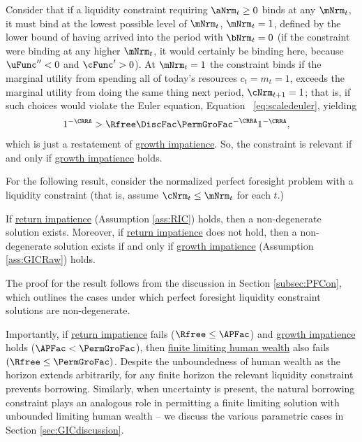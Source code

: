 \documentclass[BufferStockTheory]{subfiles}
\begin{document}
Consider that if a liquidity constraint requiring $\aNrm_{t} \geq 0$ binds at any $\mNrm_{t}$, it must bind at the lowest possible level of $\mNrm_{t}$, $\mNrm_{t}=1$, defined by the lower bound of having arrived into the period with $\bNrm_{t}=0$ (if the constraint were binding at any higher $\mNrm_{t}$, it would certainly be binding here, because $\uFunc^{\prime\prime}<0$ and $\cFunc^{\prime}>0$).
At $\mNrm_{t}=1$ the constraint binds if the marginal utility from spending all of today's resources $c_{t}=m_{t}=1$, exceeds the marginal utility from doing the same thing next period, $\cNrm_{t+1}=1$; that is, if such choices would violate the Euler equation, Equation ~\eqref{eq:scaledeuler}, yielding
\begin{align}
  1^{-\CRRA}  & > \Rfree \DiscFac \PermGroFac^{-\CRRA}1^{-\CRRA},  \label{eq:LiqConstrBinds}
\end{align}
which is just a restatement of \hyperlink{GIC}{growth impatience}.
So, the constraint is relevant if and only if \hyperlink{GICRaw}{growth impatience} holds.

For the following result, consider the normalized perfect foresight problem with a liquidity constraint (that is, assume $\cNrm_{t}\leq \mNrm_{t}$ for each $t$.)

\begin{proposition}\label{prop:PFCExist}
 If \hyperlink{RIC}{return impatience} (Assumption \ref{ass:RIC}) holds, then a non-degenerate solution exists. Moreover, if \hyperlink{RIC}{return impatience} does not hold, then a non-degenerate solution exists if and only if \hyperlink{GICRaw}{growth impatience} (Assumption \ref{ass:GICRaw}) holds. 
\end{proposition}

The proof for the result follows from the discussion in Section \ref{subsec:PFCon}, which outlines the cases under which perfect foresight liquidity constraint solutions are non-degenerate.

Importantly, if \hyperlink{RIC}{return impatience} fails ($\Rfree\leq \APFac$) and \hyperlink{GIC}{growth impatience} holds ($\APFac<\PermGroFac$), then \hyperlink{FHWC}{finite limiting  human wealth} also fails $(\Rfree \leq \PermGroFac)$.
Despite the unboundedness of human wealth as the horizon extends arbitrarily, for any finite horizon the relevant liquidity constraint prevents borrowing.
Similarly, when uncertainty is present, the natural borrowing constraint plays an analogous role in permitting a finite limiting solution with unbounded limiting human wealth -- we discuss the various parametric cases in Section \ref{sec:GICdiscussion}.
\end{document}
